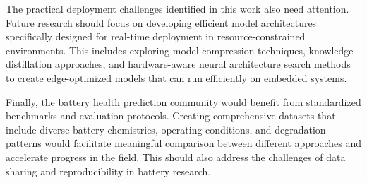 The practical deployment challenges identified in this work also need attention. Future research should focus on developing efficient model architectures specifically designed for real-time deployment in resource-constrained environments. This includes exploring model compression techniques, knowledge distillation approaches, and hardware-aware neural architecture search methods to create edge-optimized models that can run efficiently on embedded systems.

Finally, the battery health prediction community would benefit from standardized benchmarks and evaluation protocols. Creating comprehensive datasets that include diverse battery chemistries, operating conditions, and degradation patterns would facilitate meaningful comparison between different approaches and accelerate progress in the field. This should also address the challenges of data sharing and reproducibility in battery research.


